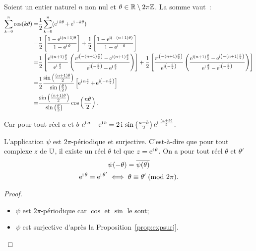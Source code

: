 Soient un entier naturel \(n\) non nul et \(\theta \in{}\mathbb{R} \setminus 2\pi\mathbb{Z}\). La 
somme vaut~:
\begin{align*}
  \sum_{k = 0}^n \cos(k\theta)  = & \frac{1}{2} \sum_{k = 0}^n (\operatorname{e}^{\operatorname{i} k 
  \theta} + \operatorname{e}^{\operatorname{i} -k \theta})\\
    = &\frac{1}{2} \left[\frac{1-\operatorname{e}^{\operatorname{i} (n + 
    1) \theta}}{1-\operatorname{e}^{\operatorname{i} \theta}} \right] + \frac{1}{2} 
    \left[ \frac{1-\operatorname{e}^{\operatorname{i} (-(n + 1)\theta)}}{1-\operatorname{e}^{\operatorname{i} -\theta}} \right]\\
    = &\frac{1}{2} \left[ \frac{\operatorname{e}^{\operatorname{i} (n + 1) 
    \frac{\theta}{2}}}{\operatorname{e}^{\operatorname{i} \frac{\theta}{2}}} \left( \frac{\operatorname{e}^{\operatorname{i} \left( 
    -(n + 1) \frac{\theta}{2} \right)} - \operatorname{e}^{\operatorname{i} (n + 1) 
    \frac{\theta}{2}}}{\operatorname{e}^{\operatorname{i} \left( -\frac{\theta}{2} \right)} - 
    \operatorname{e}^{\operatorname{i} \frac{\theta}{2}}} \right) \right] \notag + \frac{1}{2} \left[ 
    \frac{\operatorname{e}^{\operatorname{i} \left( -(n + 1) \frac{\theta}{2} \right)}}{\operatorname{e}^{\operatorname{i} \left( 
    -\frac{\theta}{2} \right)}} \left( \frac{\operatorname{e}^{\operatorname{i} (n + 1) 
    \frac{\theta}{2}}-\operatorname{e}^{\operatorname{i} \left( -(n + 1) \frac{\theta}{2} 
    \right)}}{\operatorname{e}^{\operatorname{i} \frac{\theta}{2}} - \operatorname{e}^{\operatorname{i} \left( -\frac{\theta}{2} 
    \right)}} \right) \right] \\
    = & \frac{1}{2} \frac{\sin \left( \frac{(n + 1)\theta}{2} \right)}{\sin 
    \left( \frac{\theta}{2} \right)} \left[ \operatorname{e}^{\operatorname{i} n \frac{\theta}{2}} + 
    \operatorname{e}^{\operatorname{i} \left( -n \frac{\theta}{2} \right)} \right] \\
    = & \frac{\sin \left( \frac{(n + 1)\theta}{2} \right)}{\sin \left( 
    \frac{\theta}{2} \right)} \cos \left( \frac{n\theta}{2} \right).
\end{align*}

Car pour tout réel \(a\) et \(b\) \(\operatorname{e}^{\operatorname{i} a}-\operatorname{e}^{\operatorname{i} b} = 2\operatorname{i}{}
\sin\left(\frac{a-b}{2}\right)\operatorname{e}^{\operatorname{i} \frac{(a + b)}{2}}\).

\begin{prop}
  L'application \(\psi\) est  \(2\pi\)-périodique et surjective. C'est-à-dire 
  que pour tout complexe \(z\) de \(\mathbb{U}\), il existe un réel \(\theta\) tel que 
  \(z = \operatorname{e}^{\operatorname{i} \theta}\). On a pour tout réel \(\theta\) et \(\theta'\)
  \begin{gather}
    \psi(-\theta) = \overline{\psi(\theta)}\\
    \operatorname{e}^{\operatorname{i} \theta} = \operatorname{e}^{\operatorname{i} \theta'} \iff \theta \equiv \theta'\!\pmod {2\pi}.
  \end{gather}
\end{prop}

\begin{proof}
  \begin{itemize}
    \item \(\psi\) est \(2\pi\)-périodique car \(\cos\) et \(\sin\) le sont;
    \item \(\psi\) est surjective d'après la Proposition~\ref{prop:expsurj}.
  \end{itemize}
\end{proof}

